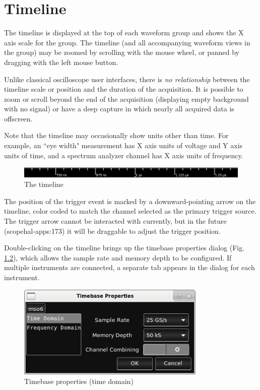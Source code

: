 \chapter{Timeline}

The timeline is displayed at the top of each waveform group and shows the X axis scale for the group. The timeline (and
all accompanying waveform views in the group) may be zoomed by scrolling with the mouse wheel, or panned by dragging
with the left mouse button.

Unlike classical oscilloscope user interfaces, there is \emph{no relationship} between the timeline scale or position
and the duration of the acquisition. It is possible to zoom or scroll beyond the end of the acquisition (displaying
empty background with no signal) or have a deep capture in which nearly all acquired data is offscreen.

Note that the timeline may occasionally show units other than time. For example, an ``eye width" measurement has X axis
units of voltage and Y axis units of time, and a spectrum analyzer channel has X axis units of frequency.


\begin{figure}[h]
\centering
\includegraphics[width=14cm]{images/timeline.png}
\caption{The timeline}
\label{timeline}
\end{figure}

The position of the trigger event is marked by a downward-pointing arrow on the timeline, color coded to match the
channel selected as the primary trigger source. The trigger arrow cannot be interacted with currently, but in the future
(scopehal-apps:173) it will be draggable to adjust the trigger position.

Double-clicking on the timeline brings up the timebase properties dialog (Fig. \ref{timebase-properties}), which allows
the sample rate and memory depth to be configured. If multiple instruments are connected, a separate tab appears in the
dialog for each instrument.

\begin{figure}[h]
\centering
\includegraphics[width=9cm]{images/timebase-properties.png}
\caption{Timebase properties (time domain)}
\label{timebase-properties}
\end{figure}

